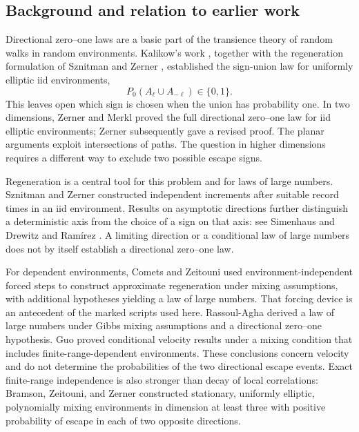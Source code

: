 \subsection{Background and relation to earlier work}

Directional zero--one laws are a basic part of the transience theory of
random walks in random environments. Kalikow's work
\cite{Kalikow1981}, together with the regeneration formulation of
Sznitman and Zerner \cite[Lemma~1.1]{SznitmanZerner1999}, established
the sign-union law for uniformly elliptic iid environments,
\[
 P_0(A_\ell\cup A_{-\ell})\in\{0,1\}.
\]
This leaves open which sign is chosen when the union has probability
one. In two dimensions, Zerner and Merkl \cite{ZernerMerkl2001}
proved the full directional zero--one law for iid elliptic environments;
Zerner \cite{Zerner2007} subsequently gave a revised proof. The planar
arguments exploit intersections of paths. The question in higher
dimensions requires a different way to exclude two possible escape signs.

Regeneration is a central tool for this problem and for laws of large
numbers. Sznitman and Zerner
\cite[Theorem~1.4 and Corollary~1.5]{SznitmanZerner1999} constructed
independent increments after suitable record times in an iid environment.
Results on asymptotic directions further distinguish a deterministic
axis from the choice of a sign on that axis: see Simenhaus
\cite{Simenhaus2007} and Drewitz and Ram\'irez
\cite{DrewitzRamirez2010}. A limiting direction or a conditional law of
large numbers does not by itself establish a directional zero--one law.

For dependent environments, Comets and Zeitouni
\cite{CometsZeitouni2004} used environment-independent forced steps to
construct approximate regeneration under mixing assumptions, with
additional hypotheses yielding a law of large numbers. That forcing
device is an antecedent of the marked scripts used here. Rassoul-Agha
\cite{RassoulAgha2005} derived a law of large numbers under Gibbs mixing
assumptions and a directional zero--one hypothesis. Guo
\cite{Guo2014} proved conditional velocity results under a mixing
condition that includes finite-range-dependent environments. These
conclusions concern velocity and do not determine the probabilities of
the two directional escape events. Exact finite-range independence is
also stronger than decay of local correlations: Bramson, Zeitouni, and
Zerner \cite[Theorem~3]{BramsonZeitouniZerner2006} constructed stationary,
uniformly elliptic, polynomially mixing environments in dimension at
least three with positive probability of escape in each of two opposite
directions.

